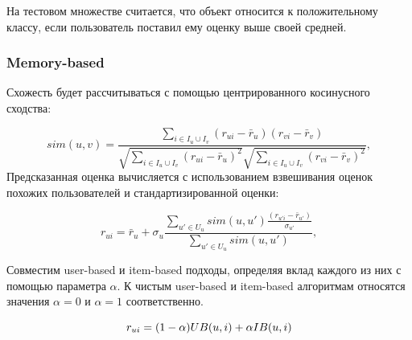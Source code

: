 На тестовом множестве считается, что объект относится к положительному классу, если пользователь поставил ему оценку выше своей средней.

\subsubsection{Memory-based}
Схожесть будет рассчитываться с помощью центрированного косинусного сходства:

\begin{equation}
    sim(u, v) = \frac
    {\sum_{i \in I_u \cup I_v}{(r_{ui} - \bar r_u)(r_{vi} - \bar r_v)}}
    {\sqrt{\sum_{i \in I_u \cup I_v}{(r_{ui} - \bar r_u)^2}} 
    \sqrt{\sum_{i \in I_u \cup I_v}{(r_{vi} - \bar r_v)^2}}},\label{eq:equation2}
\end{equation}
Предсказанная оценка вычисляется с использованием взвешивания оценок похожих пользователей и стандартизированной оценки:

\begin{equation}
    r_{ui} = \bar r_u + \sigma_u \frac
    {\sum_{u' \in U_u}{sim(u, u')\frac{(r_{u'i} - \bar r_{u'})}{\sigma_{u'}}}}
    {\sum_{u' \in U_u}{sim(u, u')}},\label{eq:equation3}
\end{equation}

Совместим user-based и item-based подходы, определяя вклад каждого из них с помощью параметра $\alpha$.
К чистым user-based и item-based алгоритмам относятся значения $\alpha = 0$ и $\alpha = 1$ соответственно.

\begin{equation}\label{eq:memory_hybrid}
r_{ui} = (1 - \alpha)\space UB(u, i) + \alpha\space IB(u,i)
\end{equation}

